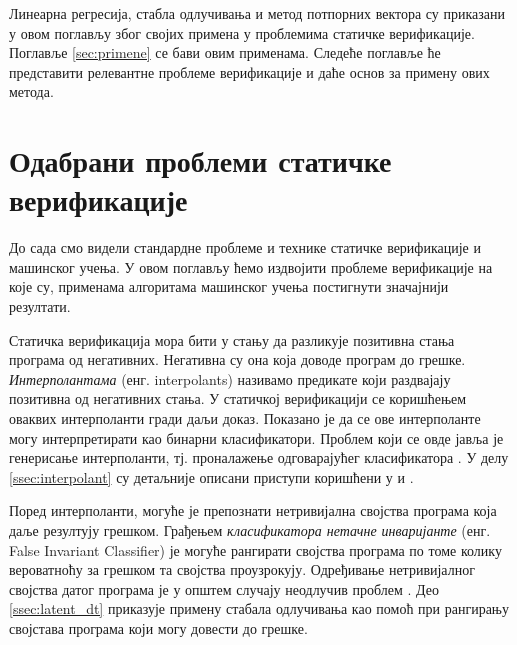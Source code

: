 \documentclass[a4paper]{article}
\begin{document}
{Линеарна регресија, стабла одлучивања и метод потпорних вектора су приказани у овом поглављу због својих примена у проблемима статичке верификације. Поглавље \ref{sec:primene} се бави овим применама. Следеће поглавље ће представити релевантне проблеме верификације и даће основ за примену ових метода.

\section{Одабрани проблеми статичке верификације}
До сада смо видели стандардне проблеме и технике статичке верификације и машинског учења. У овом поглављу ћемо издвојити проблеме верификације на које су, применама алгоритама машинског учења постигнути значајнији резултати.


Статичка верификација мора бити у стању да разликује позитивна стања програма од негативних.
Негативна су она која доводе програм до грешке. \textit{Интерполантама} (енг. interpolants)
називамо предикате који раздвајају позитивна од негативних стања.
У статичкој верификацији се коришћењем оваквих интерполанти гради даљи доказ.
Показано је да се ове интерполанте могу интерпретирати као бинарни класификатори.
Проблем који се овде јавља је генерисање интерполанти, тј. проналажење одговарајућег класификатора \cite{Sharma_interpolantsas}.
У делу  \ref{ssec:interpolant} су детаљније описани приступи коришћени у \cite{Sharma_interpolantsas} и \cite{KrishnaPW15}.

Поред интерполанти, могуће је препознати нетривијална својства програма која даље резултују грешком.
Грађењем \textit{класификатора нетачне инваријанте} (енг. False Invariant Classifier) је могуће рангирати
својства програма по томе колику вероватноћу за грешком та својства проузрокују.
Одређивање нетривијалног својства датог програма је у општем случају неодлучив проблем \cite{Brun04findinglatent, turing}.
Део \ref{ssec:latent_dt} приказује примену стабала одлучивања као помоћ при рангирању својстава програма који могу
довести до грешке.

}
\end{document}

